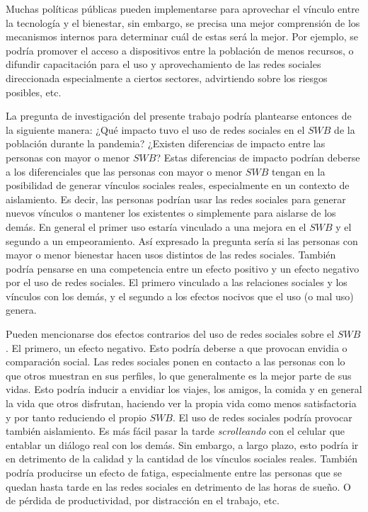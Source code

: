 \documentclass[11pt]{article}
\begin{document}
Muchas políticas públicas pueden implementarse para aprovechar el vínculo entre la tecnología y el bienestar, sin embargo, se precisa una mejor comprensión de los mecanismos internos para determinar cuál de estas será la mejor. Por ejemplo, se podría promover el acceso a dispositivos entre la población de menos recursos, o difundir capacitación para el uso y aprovechamiento de las redes sociales direccionada especialmente a ciertos sectores, advirtiendo sobre los riesgos posibles, etc. 

La pregunta de investigación del presente trabajo podría plantearse entonces de la siguiente manera: ¿Qué impacto tuvo el uso de redes sociales en el $SWB$ de la población durante la pandemia? ¿Existen diferencias de impacto entre las personas con mayor o menor $SWB$? Estas diferencias de impacto podrían deberse a los diferenciales que las personas con mayor o menor $SWB$ tengan en la posibilidad de generar vínculos sociales reales, especialmente en un contexto de aislamiento. Es decir, las personas podrían usar las redes sociales para generar nuevos vínculos o mantener los existentes o simplemente para aislarse de los demás. En general el primer uso estaría vinculado a una mejora en el $SWB$ y el segundo a un empeoramiento. Así expresado la pregunta sería si las personas con mayor o menor bienestar hacen usos distintos de las redes sociales. También podría pensarse en una competencia entre un efecto positivo y un efecto negativo por el uso de redes sociales. El primero vinculado a las relaciones sociales y los vínculos con los demás, y el segundo a los efectos nocivos que el uso (o mal uso) genera. 

Pueden mencionarse dos efectos contrarios del uso de redes sociales sobre el $SWB$. El primero, un efecto negativo. Esto podría deberse a que provocan envidia o comparación social. Las redes sociales ponen en contacto a las personas con lo que otros muestran en sus perfiles, lo que generalmente es la mejor parte de sus vidas. Esto podría inducir a envidiar los viajes, los amigos, la comida y en general la vida que otros disfrutan, haciendo ver la propia vida como menos satisfactoria y por tanto reduciendo el propio $SWB$. El uso de redes sociales podría provocar también aislamiento. Es más fácil pasar la tarde \textit{scrolleando} con el celular que entablar un diálogo real con los demás. Sin embargo, a largo plazo, esto podría ir en detrimento de la calidad y la cantidad de los vínculos sociales reales. También podría producirse un efecto de fatiga, especialmente entre las personas que se quedan hasta tarde en las redes sociales en detrimento de las horas de sueño. O de pérdida de productividad, por distracción en el trabajo, etc.
\end{document}
